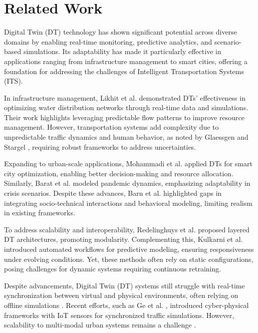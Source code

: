 \section{Related Work}


Digital Twin (DT) technology has shown significant potential across diverse domains by enabling real-time monitoring, predictive analytics, and scenario-based simulations. Its adaptability has made it particularly effective in applications ranging from infrastructure management to smart cities, offering a foundation for addressing the challenges of Intelligent Transportation Systems (ITS).

In infrastructure management, Likhit et al. \cite{kanigolla2024architecting} demonstrated DTs' effectiveness in optimizing water distribution networks through real-time data and simulations. Their work highlights leveraging predictable flow patterns to improve resource management. However, transportation systems add complexity due to unpredictable traffic dynamics and human behavior, as noted by Glaessgen and Stargel \cite{glaessgen2012digital}, requiring robust frameworks to address uncertainties.

Expanding to urban-scale applications, Mohammadi et al. \cite{MohammadiSmartCity} applied DTs for smart city optimization, enabling better decision-making and resource allocation. Similarly, Barat et al. \cite{barat2022agent} modeled pandemic dynamics, emphasizing adaptability in crisis scenarios. Despite these advances, Barn et al. \cite{balbir} highlighted gaps in integrating socio-technical interactions and behavioral modeling, limiting realism in existing frameworks.

To address scalability and interoperability, Redelinghuys et al. \cite{redelinghuys2020six} proposed layered DT architectures, promoting modularity. Complementing this, Kulkarni et al. \cite{kulkarni2023dtworkflow} introduced automated workflows for predictive modeling, ensuring responsiveness under evolving conditions. Yet, these methods often rely on static configurations, posing challenges for dynamic systems requiring continuous retraining.

Despite advancements, Digital Twin (DT) systems still struggle with real-time synchronization between virtual and physical environments, often relying on offline simulations \cite{baolixia}. Recent efforts, such as Ge et al. \cite{kuvsic2023digital}, introduced cyber-physical frameworks with IoT sensors for synchronized traffic simulations. However, scalability to multi-modal urban systems remains a challenge \cite{lee2015cyber}.

